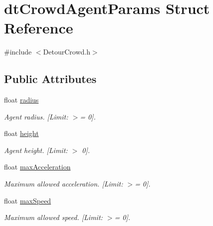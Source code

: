 \hypertarget{structdtCrowdAgentParams}{}\section{dt\+Crowd\+Agent\+Params Struct Reference}
\label{structdtCrowdAgentParams}


{\ttfamily \#include $<$Detour\+Crowd.\+h$>$}

\subsection*{Public Attributes}
\begin{DoxyCompactItemize}
\item 
\mbox{\label{structdtCrowdAgentParams_a780421355c73aecb187c1aa36de854d8}} 
float \hyperlink{structdtCrowdAgentParams_a780421355c73aecb187c1aa36de854d8}{radius}
\begin{DoxyCompactList}\small\item\em Agent radius. \mbox{[}Limit\+: $>$= 0\mbox{]}. \end{DoxyCompactList}\item 
\mbox{\label{structdtCrowdAgentParams_a762f702ee5339eebaf252d391f31a586}} 
float \hyperlink{structdtCrowdAgentParams_a762f702ee5339eebaf252d391f31a586}{height}
\begin{DoxyCompactList}\small\item\em Agent height. \mbox{[}Limit\+: $>$ 0\mbox{]}. \end{DoxyCompactList}\item 
\mbox{\label{structdtCrowdAgentParams_a2d1b22f12d2faf77c052b1bae3a27ada}} 
float \hyperlink{structdtCrowdAgentParams_a2d1b22f12d2faf77c052b1bae3a27ada}{max\+Acceleration}
\begin{DoxyCompactList}\small\item\em Maximum allowed acceleration. \mbox{[}Limit\+: $>$= 0\mbox{]}. \end{DoxyCompactList}\item 
\mbox{\label{structdtCrowdAgentParams_a2a023328c7266577eedeba25e480479f}} 
float \hyperlink{structdtCrowdAgentParams_a2a023328c7266577eedeba25e480479f}{max\+Speed}
\begin{DoxyCompactList}\small\item\em Maximum allowed speed. \mbox{[}Limit\+: $>$= 0\mbox{]}. \end{DoxyCompactList}\item 

\end{DoxyCompactItemize}
